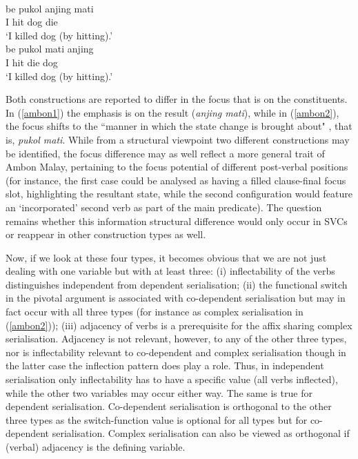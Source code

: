 \ea \label{ambon}
\\
\ea \label{ambon1}
\gll be pukol anjing mati \\
I hit dog die \\
\glft `I killed dog (by hitting).' \\ 
\ex \label{ambon2}
\gll be pukol mati anjing \\ 
I hit die dog \\
\glft `I killed dog (by hitting).'\\ 
\z
\z

Both constructions are reported to differ in the focus that is on the constituents. In (\ref{ambon1}) the emphasis is on the result (\textit{anjing mati}), while in (\ref{ambon2}), the focus shifts to the ``manner in which the state change is brought about" \citep[41]{vanstaden2008serial}, that is, \textit{pukol mati}. While from a structural viewpoint two different constructions may be identified, the focus difference may as well reflect a more general trait of Ambon Malay, pertaining to the focus potential of different post-verbal positions (for instance, the first case could be analysed as having a filled clause-final focus slot, highlighting the resultant state, while the second configuration would feature an `incorporated' second verb as part of the main predicate). The question remains whether this information structural difference would only occur in SVCs or reappear in other construction types as well.

Now, if we look at these four types, it becomes obvious that we are not just dealing with one variable but with at least three: (i) inflectability of the verbs distinguishes independent from dependent serialisation; (ii) the functional switch in the pivotal argument is associated with co-dependent serialisation but may in fact occur with all three types (for instance as complex serialisation in (\ref{ambon2})); (iii) adjacency of verbs is a prerequisite for the affix sharing complex serialisation. Adjacency is not relevant, however, to any of the other three types, nor is inflectability relevant to co-dependent and complex serialisation though in the latter case the inflection pattern does play a role. Thus, in independent serialisation only inflectability has to have a specific value (all verbs inflected), while the other two variables may occur either way. The same is true for dependent serialisation. Co-dependent serialisation is orthogonal to the other three types as the switch-function value is optional for all types but for co-dependent serialisation. Complex serialisation can also be viewed as orthogonal if (verbal) adjacency is the defining variable. 

